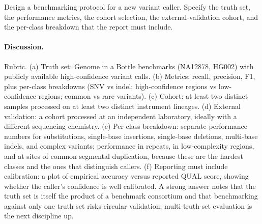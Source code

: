 \begin{exercise}
Design a benchmarking protocol for a new variant caller. Specify the
truth set, the performance metrics, the cohort selection, the
external-validation cohort, and the per-class breakdown that the
report must include.

\paragraph{Discussion.}
Rubric. (a) Truth set: Genome in a Bottle benchmarks (NA12878,
HG002) with publicly available high-confidence variant calls. (b)
Metrics: recall, precision, F1, plus per-class breakdowns (SNV vs
indel; high-confidence regions vs low-confidence regions; common vs
rare variants). (c) Cohort: at least two distinct samples processed
on at least two distinct instrument lineages. (d) External validation:
a cohort processed at an independent laboratory, ideally with a
different sequencing chemistry. (e) Per-class breakdown: separate
performance numbers for substitutions, single-base insertions,
single-base deletions, multi-base indels, and complex variants;
performance in repeats, in low-complexity regions, and at sites of
common segmental duplication, because these are the hardest classes
and the ones that distinguish callers. (f) Reporting must include
calibration: a plot of empirical accuracy versus reported QUAL
score, showing whether the caller's confidence is well calibrated.
A strong answer notes that the truth set is itself the product of a
benchmark consortium and that benchmarking against only one truth set
risks circular validation; multi-truth-set evaluation is the next
discipline up.
\end{exercise}

